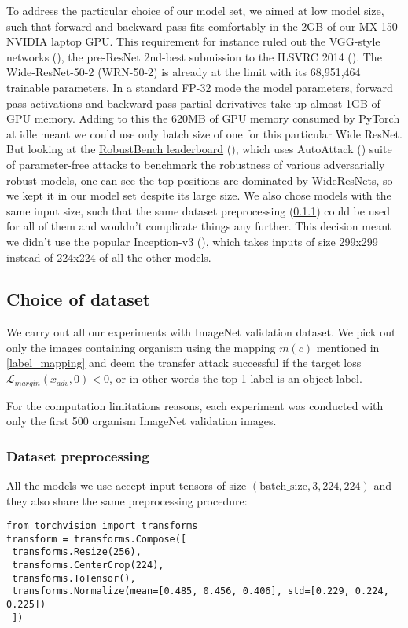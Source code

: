 To address the particular choice of our model set, we aimed at low model size, such that forward and backward pass fits comfortably in the 2GB of our MX-150 NVIDIA laptop GPU. This requirement for instance ruled out the VGG-style networks (\cite{simonyan2015deep}), the pre-ResNet 2nd-best submission to the ILSVRC 2014 (\cite{russakovsky2015imagenet}). The Wide-ResNet-50-2 (WRN-50-2) is already at the limit with its 68,951,464 trainable parameters. In a standard FP-32 mode the model parameters, forward pass activations and backward pass partial derivatives take up almost 1GB of GPU memory. Adding to this the 620MB of GPU memory consumed by PyTorch at idle meant we could use only batch size of one for this particular Wide ResNet. But looking at the \href{https://robustbench.github.io/}{RobustBench leaderboard} (\cite{croce2021robustbench}), which uses AutoAttack (\cite{croce2020reliable}) suite of parameter-free attacks to benchmark the robustness of various adversarially robust models, one can see the top positions are dominated by WideResNets, so we kept it in our model set despite its large size.
We also chose models with the same input size, such that the same dataset preprocessing (\ref{dataset_preprocessing}) could be used for all of them and wouldn't complicate things any further. This decision meant we didn't use the popular Inception-v3 (\cite{szegedy2015rethinking}), which takes inputs of size 299x299 instead of 224x224 of all the other models.



\subsection{Choice of dataset}
We carry out all our experiments with ImageNet validation dataset. We pick out only the images containing organism using the mapping $m(c)$ mentioned in \ref{label_mapping} and deem the transfer attack successful if the target loss $\mathcal{L}_{margin}(x_{adv}, 0) < 0$, or in other words the top-1 label is an object label.

For the computation limitations reasons, each experiment was conducted with only the first 500 organism ImageNet validation images.

\subsubsection{Dataset preprocessing}
\label{dataset_preprocessing}
All the models we use accept input tensors of size $(\text{batch\_size}, 3, 224, 224)$ and they also share the same preprocessing procedure:
\begin{verbatim}
from torchvision import transforms
transform = transforms.Compose([
 transforms.Resize(256),
 transforms.CenterCrop(224),
 transforms.ToTensor(),
 transforms.Normalize(mean=[0.485, 0.456, 0.406], std=[0.229, 0.224, 0.225])
 ])
\end{verbatim}

